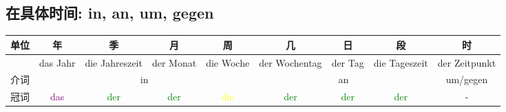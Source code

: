 \subsection{在具体时间: in, an, um, gegen}
\label{time:prep:summary}
\begin{center}
    \begin{tabular}{|c|c|c|c|c|c|c|c|c|}
        \hline
        \rowcolor{gray}
        单位 & 年                       & 季                       & 月                      & 周                       & 几                      & 日                      & 段                      & 时             \\
        \hline
           & das Jahr                & die Jahreszeit          & der Monat              & die Woche               & der Wochentag          & der Tag                & die Tageszeit          & der Zeitpunkt \\
        \hline
        介词 & \multicolumn{4}{c|}{in} & \multicolumn{3}{c|}{an} & um/gegen                                                                                                                                    \\
        \hline
        冠词 & \textcolor{purple}{das} & \textcolor{green}{der}  & \textcolor{green}{der} & \textcolor{yellow}{die} & \textcolor{green}{der} & \textcolor{green}{der} & \textcolor{green}{der} & -             \\
        \hline

\end{tabular}
\end{center}
